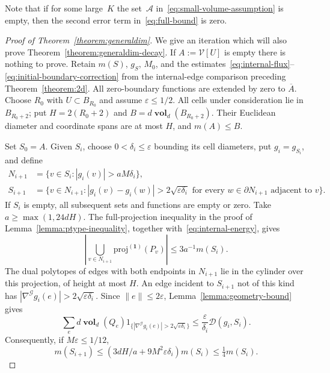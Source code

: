 \documentclass[12pt]{amsart}
\numberwithin{equation}{section}
\newcommand{\V}{\mathcal{V}}
\newcommand{\eps}{\varepsilon}
\newcommand{\projone}{\boldsymbol{\mathrm{proj}^{(1)}}}
\newcommand{\D}{\hyperref[eq:dir.energy]{\mathcal{D}}}
\DeclareMathOperator{\vol}{\mathbf{vol}}
\begin{document}
	Note that if for some large~$K$ the set~$\mathcal{A}$ in~\eqref{eq:small-volume-assumption} is empty, then the second error term 
	in~\eqref{eq:full-bound} is zero. 
\begin{proof}[Proof of Theorem~\ref{theorem:generaldim}]
We give an iteration which will also prove Theorem~\ref{theorem:generaldim-decay}. If $A:=\V[U]$ is empty there is nothing to prove. Retain $m(S)$, $g_S$, $M_0$, and the estimates~\eqref{eq:internal-flux}--\eqref{eq:initial-boundary-correction} from the internal-edge comparison preceding Theorem~\ref{theorem:2d}. All zero-boundary functions are extended by zero to $\overline A$.
Choose $R_0$ with $U\subset B_{R_0}$ and assume $\eps\le1/2$. All cells under consideration lie in $B_{R_0+2}$; put $H=2(R_0+2)$ and $B=d\vol_d(B_{R_0+2})$. Their Euclidean diameter and coordinate spans are at most $H$, and $m(A)\le B$.

Set $S_0=A$. Given $S_i$, choose $0<\delta_i\leq\eps$ bounding its cell diameters, put $g_i=g_{S_i}$, and define
\begin{align*}
 N_{i+1}&=\{v\in S_i:|g_i(v)|>aM\delta_i\},\\
 S_{i+1}&=\{v\in N_{i+1}:|g_i(v)-g_i(w)|>2\sqrt{\eps\delta_i}
                  \text{ for every }w\in\partial N_{i+1}\text{ adjacent to }v\}.
\end{align*}
If $S_i$ is empty, all subsequent sets and functions are empty or zero. Take $a\geq\max(1,24dH)$. The full-projection inequality in the proof of Lemma~\ref{lemma:ptype-inequality}, together with~\eqref{eq:internal-energy}, gives
\[
 \left|\bigcup_{v\in N_{i+1}}\projone(P_v)\right|\leq3a^{-1}m(S_i).
\]
The dual polytopes of edges with both endpoints in $N_{i+1}$ lie in the cylinder over this projection, of height at most $H$. An edge incident to $S_{i+1}$ not of this kind has $|\nabla^{\mathcal G}g_i(e)|>2\sqrt{\eps\delta_i}$. Since $\|e\|\leq2\eps$, Lemma~\ref{lemma:geometry-bound} gives
\[
 \sum_e d\vol_d(Q_e)1_{\{|\nabla^{\mathcal G}g_i(e)|>2\sqrt{\eps\delta_i}\}}
 \leq\frac{\eps}{\delta_i}\D(g_i,S_i).
\]
Consequently, if $M\eps\leq1/12$,
\begin{equation}\label{eq:repaired-contraction}
 m(S_{i+1})\leq(3dH/a+9M^2\eps\delta_i)m(S_i)
               \leq\tfrac14m(S_i).
\end{equation}


\end{proof}
\end{document}
